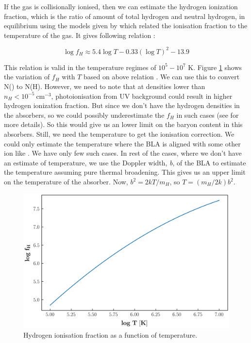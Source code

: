 If the gas is collisionally ionised, then we can estimate the hydrogen ionization fraction, which is the ratio of amount of total hydrogen and neutral hydrogen, in equilibrium using the models given by \citet{Sutherland-1993} which related the ionisation fraction to the temperature of the gas. It gives following relation :

\begin{equation} 
    \log f_H \approx 5.4 \log T - 0.33(\log T)^2 -13.9
\end{equation}

This relation is valid in the temperature regimes of $10^5-10^7$ K. Figure \ref{fig:fH} shows the variation of $f_H$ with $T$ based on above relation . We can use this to convert N() to N(H). However, we need to note that at densities lower than $n_H < 10^{-5} \ \text{cm}^{-3}$, photoionisation from UV background could result in higher hydrogen ionization fraction. But since we don't have the hydrogen densities in the absorbers, so we could possibly underestimate the $f_H$ in such cases (see \citet{Richter_2020, Fang-2001} for more details). So this would give us an lower limit on the baryon content in this absorbers. Still, we need the temperature to get the ionisation correction. We could only estimate the temperature where the BLA is aligned with some other ion like . We have only few such cases. In rest of the cases, where we don't have an estimate of temperature, we use the Doppler width, \emph{b}, of the BLA to estimate the temperature assuming pure thermal broadening. This gives us an upper limit on the temperature of the absorber. Now, $b^2=2kT/m_H$, so $T=(m_H / 2k) b^2 $. 

\begin{figure}[t]
    \centering
    \includegraphics[width=\linewidth]{Figures/fH_vs_T.png}
    \caption{Hydrogen ionisation fraction as a function of temperature.}
    \label{fig:fH}
\end{figure}

